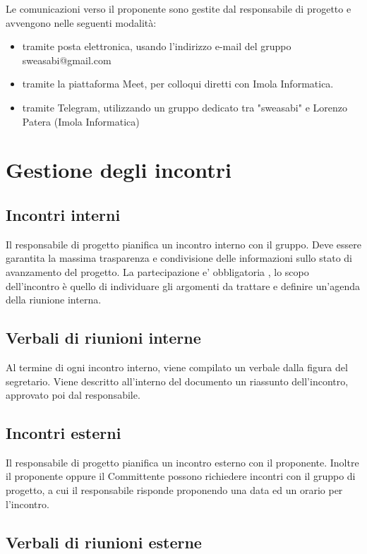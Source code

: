 Le comunicazioni verso il proponente sono gestite dal responsabile di progetto e avvengono nelle seguenti modalità:

\begin{itemize}
\item tramite posta elettronica, usando l'indirizzo e-mail del gruppo sweasabi@gmail.com
\item tramite la piattaforma Meet, per colloqui diretti con Imola Informatica.
\item tramite Telegram, utilizzando un gruppo dedicato tra "sweasabi" e Lorenzo Patera (Imola Informatica)
\end{itemize}

\section{Gestione degli incontri}

\subsection{Incontri interni}

Il responsabile di progetto pianifica un incontro interno con il gruppo. Deve essere garantita la massima trasparenza e condivisione delle informazioni sullo stato di avanzamento del progetto.
La partecipazione e' obbligatoria , lo scopo dell'incontro è quello di individuare gli argomenti da trattare e definire un'agenda della riunione interna.

\subsection{Verbali di riunioni interne}

Al termine di ogni incontro interno, viene compilato un verbale dalla figura del segretario. Viene descritto all'interno del documento un riassunto dell'incontro, approvato poi dal responsabile.

\subsection{Incontri esterni}

Il responsabile di progetto pianifica un incontro esterno con il proponente. Inoltre il proponente oppure il Committente possono richiedere incontri con il gruppo di progetto, a cui il responsabile risponde proponendo una data ed un orario per l'incontro.

\subsection{Verbali di riunioni esterne}

